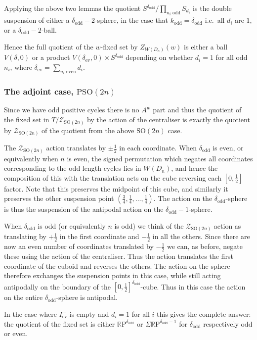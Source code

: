 \documentclass[11pt,a4paper]{article}
\def\SO{\mathrm{SO}}
\def\PSO{\mathrm{PSO}}
\def\R{\mathbb{R}}
\def\cZ{\mathcal{Z}}
\def\RP{\R\mathrm{P}}
\def\cZ{{\mathcal Z}}
\def\ev{\mathrm{ev}}
\def\odd{\mathrm{odd}}
\def\ZDSO{\cZ_{\SO(2n)}}
\begin{document}
Applying the above two lemmas the quotient $S^{\delta_\odd}/\prod_{n_i \text{ odd}} S_{d_i}$ is the double suspension of either a ${\delta_\odd}-2$-sphere, in the case that $k_\odd={\delta_\odd}$ i.e.\  all $d_i$ are $1$, or a ${\delta_\odd}-2$-ball.




Hence the full quotient of the $w$-fixed set by $Z_{W(D_n)}(w)$ is either a ball $V(\delta,0)$ or a product $V(\delta_\ev,0)\times S^{\delta_\odd}$ depending on whether $d_i=1$ for all odd $n_i$, where $\delta_\ev=\sum\limits_{n_i\text{ even}} d_i$.

\subsubsection{The adjoint case, $\PSO(2n)$}

Since we have odd positive cycles there is no $A^w$ part and thus the quotient of the fixed set in $T/\ZDSO$ by the action of
the centraliser is exactly the quotient by $\ZDSO$ of the quotient from the above $\SO(2n)$ case.

The $\ZDSO$ action translates by $\pm\frac12$ in each coordinate.  When ${\delta_\odd}$ is even, or equivalently when $n$ is even,
the signed permutation which negates all coordinates corresponding to the odd length cycles lies in $W(D_n)$, and hence the composition of this with the translation acts on the cube reversing each $[0,\frac 12]$ factor.  Note that this preserves the midpoint of this cube, and similarly it preserves the other suspension point $(\frac 34,\frac 14,\dots,\frac14)$. The action on the ${\delta_\odd}$-sphere is thus the suspension of the antipodal action on the ${\delta_\odd}-1$-sphere.

When ${\delta_\odd}$ is odd (or equivalently $n$ is odd) we think of the $\ZDSO$ action as translating by $+\frac12$ in the first coordinate and $-\frac 12$ in all the others. Since there are now an even number of coordinates translated by $-\frac12$ we can, as before, negate these using the action of the centraliser.  Thus the action translates the first coordinate of the cuboid and reverses the others. The action on the sphere therefore exchanges the suspension points in this case, while still acting antipodally on the boundary of the $[0,\frac 12]^{{\delta_\odd}}$-cube. Thus in this case the action on the entire ${\delta_\odd}$-sphere is antipodal.

In the case where $I^+_\ev$ is empty and $d_i=1$ for all $i$ this gives the complete answer: the quotient of the fixed set is either $\RP^{\delta_\odd}$ or $\Sigma \RP^{{\delta_\odd}-1}$ for ${\delta_\odd}$ respectively odd or even.
\end{document}

